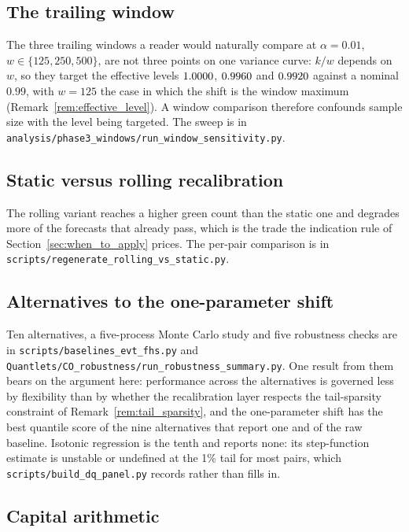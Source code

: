 \documentclass[preprint,11pt,authoryear]{elsarticle}
\newcommand{\1}{\boldsymbol{1}}
\begin{document}
\subsection{The trailing window}
\label{sec:window}

The three trailing windows a reader would naturally compare at $\alpha = 0.01$, $w \in \{125, 250, 500\}$, are not three points on one variance curve: $k/w$ depends on $w$, so they target the effective levels $1.0000$, $0.9960$ and $0.9920$ against a nominal $0.99$, with $w = 125$ the case in which the shift is the window maximum (Remark~\ref{rem:effective_level}). A window comparison therefore confounds sample size with the level being targeted. The sweep is in \texttt{analysis/phase3\_windows/run\_window\_sensitivity.py}.

\subsection{Static versus rolling recalibration}
\label{sec:static_rolling}

The rolling variant reaches a higher green count than the static one and degrades more of the forecasts that already pass, which is the trade the indication rule of Section~\ref{sec:when_to_apply} prices. The per-pair comparison is in \texttt{scripts/regenerate\_rolling\_vs\_static.py}.

\subsection{Alternatives to the one-parameter shift}
\label{sec:baselines}

Ten alternatives, a five-process Monte Carlo study and five robustness checks are
in \texttt{scripts/baselines\_evt\_fhs.py} and
\texttt{Quantlets/CO\_robustness/run\_robustness\_summary.py}. One result from them bears on the argument here:
performance across the alternatives is governed less by flexibility than by
whether the recalibration layer respects the tail-sparsity constraint of
Remark~\ref{rem:tail_sparsity}, and the one-parameter shift has the best quantile
score of the nine alternatives that report one and of the raw baseline.
Isotonic regression is the tenth and reports none: its step-function estimate is
unstable or undefined at the 1\% tail for most pairs, which \texttt{scripts/build\_dq\_panel.py}
records rather than fills in.
\subsection{Capital arithmetic}
\label{sec:economic}
\end{document}
